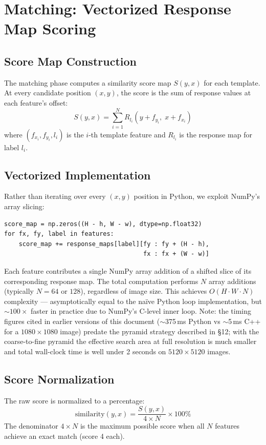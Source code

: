 \documentclass[12pt,a4paper]{article}
\begin{document}
\section{Matching: Vectorized Response Map Scoring}

\subsection{Score Map Construction}
The matching phase computes a similarity score map $S(y,x)$ for each template.  At
every candidate position $(x,y)$, the score is the sum of response values at each
feature's offset:
\begin{equation}
  S(y,x) = \sum_{i=1}^{N} R_{l_i}(y + f_{y_i},\; x + f_{x_i})
\end{equation}
where $(f_{x_i}, f_{y_i}, l_i)$ is the $i$-th template feature and $R_{l_i}$ is the
response map for label $l_i$.

\subsection{Vectorized Implementation}
Rather than iterating over every $(x,y)$ position in Python, we exploit NumPy's
array slicing:

\begin{lstlisting}[style=python, caption={Vectorized score map accumulation}]
score_map = np.zeros((H - h, W - w), dtype=np.float32)
for fx, fy, label in features:
    score_map += response_maps[label][fy : fy + (H - h),
                                      fx : fx + (W - w)]
\end{lstlisting}

Each feature contributes a single NumPy array addition of a shifted slice of its
corresponding response map.  The total computation performs $N$ array additions
(typically $N = 64$ or $128$), regardless of image size.  This achieves
$O(H \cdot W \cdot N)$ complexity --- asymptotically equal to the na\"ive Python loop
implementation, but $\sim 100\times$ faster in practice due to NumPy's C-level inner
loop.  Note: the timing figures cited in earlier versions of this document
($\sim$375\,ms Python vs $\sim$5\,ms C++ for a $1080\times 1080$ image) predate the
pyramid strategy described in §12; with the coarse-to-fine pyramid the effective
search area at full resolution is much smaller and total wall-clock time is well
under 2 seconds on $5120\times 5120$ images.

\subsection{Score Normalization}
The raw score is normalized to a percentage:
\begin{equation}
  \text{similarity}(y,x) = \frac{S(y,x)}{4 \times N} \times 100\%
\end{equation}
The denominator $4 \times N$ is the maximum possible score when all $N$ features
achieve an exact match (score 4 each).
\end{document}
